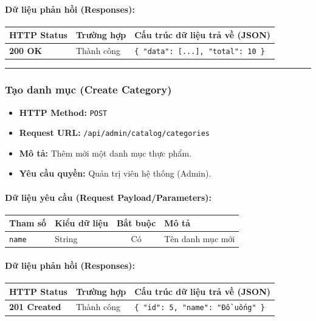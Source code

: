 \documentclass[12pt,a4paper]{article}
\begin{document}
\paragraph{Dữ liệu phản hồi (Responses):}
\begin{longtable}{|>{\raggedright\arraybackslash}p{2.8cm}|>{\raggedright\arraybackslash}p{3.2cm}|>{\raggedright\arraybackslash}p{8.0cm}|}
\hline
\textbf{HTTP Status} & \textbf{Trường hợp} & \textbf{Cấu trúc dữ liệu trả về (JSON)} \\ \hline
\endhead
\textbf{200 OK} & Thành công & \texttt{\{ "data": [...], "total": 10 \}} \\ \hline
\end{longtable}

\vskip 0.4cm
\noindent\rule{\textwidth}{0.3pt}
\vskip 0.4cm

\subsubsection{Tạo danh mục (Create Category)}
\begin{itemize}[leftmargin=*]
    \item \textbf{HTTP Method:} \texttt{POST}
    \item \textbf{Request URL:} \texttt{/api/admin/catalog/categories}
    \item \textbf{Mô tả:} Thêm mới một danh mục thực phẩm.
    \item \textbf{Yêu cầu quyền:} Quản trị viên hệ thống (Admin).
\end{itemize}

\paragraph{Dữ liệu yêu cầu (Request Payload/Parameters):}
\begin{longtable}{|>{\raggedright\arraybackslash}p{2.8cm}|>{\raggedright\arraybackslash}p{2.2cm}|c|>{\raggedright\arraybackslash}p{7.0cm}|}
\hline
\textbf{Tham số} & \textbf{Kiểu dữ liệu} & \textbf{Bắt buộc} & \textbf{Mô tả} \\ \hline
\endhead
\texttt{name} & String & Có & Tên danh mục mới \\ \hline
\end{longtable}

\paragraph{Dữ liệu phản hồi (Responses):}
\begin{longtable}{|>{\raggedright\arraybackslash}p{2.8cm}|>{\raggedright\arraybackslash}p{3.2cm}|>{\raggedright\arraybackslash}p{8.0cm}|}
\hline
\textbf{HTTP Status} & \textbf{Trường hợp} & \textbf{Cấu trúc dữ liệu trả về (JSON)} \\ \hline
\endhead
\textbf{201 Created} & Thành công & \texttt{\{ "id": 5, "name": "Đồ uống" \}} \\ \hline
\end{longtable}
\end{document}
